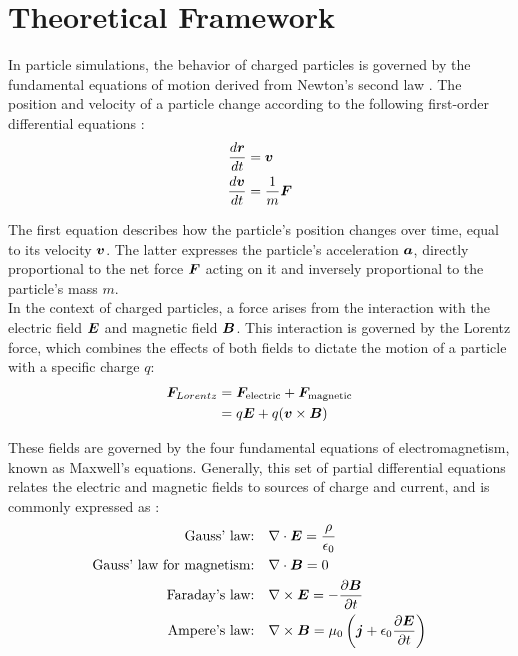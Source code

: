 \chapter{Theoretical Framework}
In particle simulations, the behavior of charged particles is governed by the fundamental equations of motion derived from Newton's second law \cite{griffiths_introduction_2017}. The position and velocity of a particle change according to the following first-order differential equations \cite{brieda_plasma_2019}:
\begin{align}
    \frac{d\bm{r}}{dt} &= \bm{v}\\
    \frac{d\bm{v}}{dt} &= \frac{1}{m} \bm{F}
\end{align}

The first equation describes how the particle's position changes over time, equal to its velocity $\bm{v}$. The latter expresses the particle's acceleration $\bm{a}$, directly proportional to the net force $\bm{F}$ acting on it and inversely proportional to the particle's mass $m$.
\\

In the context of charged particles, a force arises from the interaction with the electric field $\bm{E}$ and magnetic field $\bm{B}$. This interaction is governed by the Lorentz force, which combines the effects of both fields to dictate the motion of a particle with a specific charge $q$:
\begin{align}
\bm{F}_{Lorentz} &= \bm{F}_{\text{electric}} + \bm{F}_{\text{magnetic}} \\
            &= q\bm{E} + q (\bm{v} \times \bm{B})
\end{align}

These fields are governed by the four fundamental equations of electromagnetism, known as Maxwell's equations. Generally, this set of partial differential equations relates the electric and magnetic fields to sources of charge and current, and is commonly expressed as \cite{zangwill_modern_2013}:
\begin{align}
\text{Gauss' law:} \quad & \nabla \cdot \bm{E} = \frac{\rho}{\epsilon_0} \\
\text{Gauss' law for magnetism:} \quad & \nabla \cdot \bm{B} = 0 \\
\text{Faraday's law:} \quad & \nabla \times \bm{E} = - \frac{\partial \bm{B}}{\partial t} \\
\text{Ampere's law:}\label{amperes law} \quad & \nabla \times \bm{B} = \mu_0 \left( \bm{j} + \epsilon_0 \frac{\partial \bm{E}}{\partial t} \right)
\end{align}


